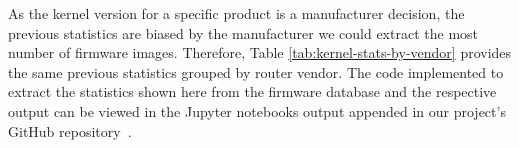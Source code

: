 As the kernel version for a specific product is a manufacturer decision, the previous statistics are biased by the manufacturer we could extract the most number of firmware images. Therefore, Table \ref{tab:kernel-stats-by-vendor} provides the same previous statistics grouped by router vendor. The code implemented to extract the statistics shown here from the firmware database and the respective output can be viewed in the Jupyter notebooks output appended in our project's GitHub repository~\cite{github:c2dc-toso}. 

\begin{table}[H]
\centering
\caption{Five most common kernel versions found in extracted firmware images by vendor.}
\end{table}

